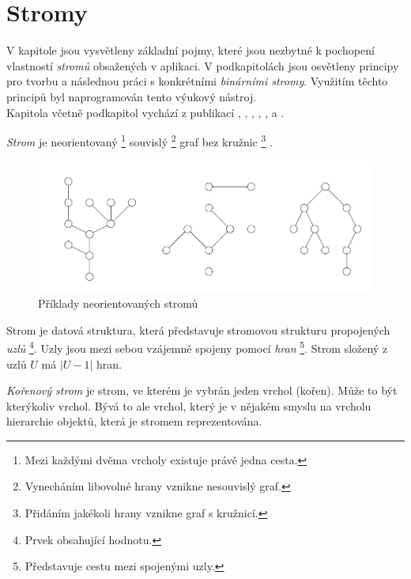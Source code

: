 \documentclass[
  biblatex=false,
  font=serif,
  glossaries=false,
  tables=false,
  theorems=false,
  index
]{kidiplom}
\begin{document}
\section{Stromy}
\indent \indent V kapitole jsou vysvětleny základní pojmy, které jsou nezbytné k pochopení vlastností \textit{stromů} obsažených v aplikaci. V podkapitolách jsou osvětleny principy pro tvorbu a následnou práci s konkrétními \textit{binárními stromy}. Využitím těchto principů byl naprogramován tento výukový nástroj.\\ 
\indent Kapitola včetně podkapitol vychází z publikací \cite{belohlavekALM}, \cite{belohlavekVychodil}, \cite{vecerka}, \cite{dvorsky}, \cite{BinarySearch}, \cite{Adelson} a \cite{cormen}.


\begin{definition}[Strom]
\indent \textit{Strom} je neorientovaný \footnote{Mezi každými dvěma vrcholy existuje právě jedna cesta.} souvislý \footnote{Vynecháním libovolné hrany vznikne nesouvislý graf.} graf bez kružnic \footnote{Přidáním jakékoli hrany vznikne graf s kružnicí.} \cite{belohlavekALM}.
\end{definition}
\begin{figure}[h!]
\centering
	\includegraphics[scale=0.6]{obrazky/1Stromy.png}
	\caption{Příklady neorientovaných stromů}
\end{figure}

\medskip
\noindent Strom je datová struktura, která představuje stromovou strukturu propojených \textit{uzlů} \footnote{Prvek obsahující hodnotu.}. Uzly jsou mezi sebou vzájemně spojeny pomocí \textit{hran} \footnote{Představuje cestu mezi spojenými uzly.}. Strom složený z uzlů $U$ má $|U - 1|$ hran.


\begin{definition}
\indent \textit{Kořenový strom} je strom, ve kterém je vybrán jeden vrchol (kořen). Může to být kterýkoliv vrchol. Bývá to ale vrchol, který je v nějakém smyslu na vrcholu hierarchie objektů, která je stromem reprezentována.
\cite{belohlavekALM}
\end{definition}
\smallskip
\end{document}
